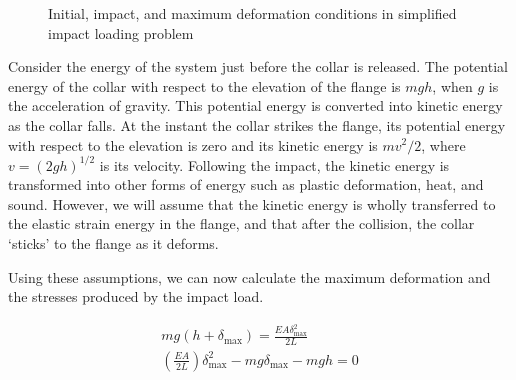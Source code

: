 \documentclass[
fontsize=10pt,
a4paper,
twosides=false,
open=any,
svgnames,
]{kaobook} %
\begin{document}
\begin{figure}[h]
  \centering
  \caption{Initial, impact, and maximum deformation conditions in simplified impact loading problem}
  \label{fig: impact loading}
  \end{figure}

  Consider the energy of the system just before the collar is released. The potential energy of the collar with respect to the elevation of the flange is $mgh$, when $g$ is the acceleration of gravity. This potential energy is converted into kinetic energy as the collar falls. At the instant the collar strikes the flange, its potential energy with respect to the elevation is zero and its kinetic energy is $mv^2/2$, where $v = (2gh)^{1/2}$ is its velocity. Following the impact, the kinetic energy is transformed into other forms of energy such as plastic deformation, heat, and sound. However, we will assume that the kinetic energy is wholly transferred to the elastic strain energy in the flange, and that after the collision, the collar `sticks' to the flange as it deforms.

Using these assumptions, we can now calculate the maximum deformation and the stresses produced by the impact load.

\begin{gather}
  mg(h+ \delta_{\max}) = \frac{EA \delta_{\max}^2}{2L} \nonumber \\
  \left( \frac{EA}{2L} \right) \delta_{\max}^2 - mg \delta_{\max} - mgh = 0 \nonumber
\end{gather}
\end{document}
